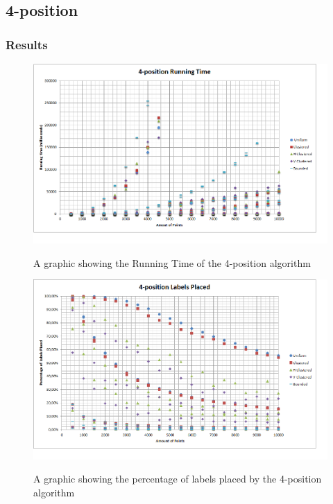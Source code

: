 \documentclass[crop=false,a4paper,oneside,11pt]{standalone}
\begin{document}
\subsection{4-position}
\subsubsection{Results}

 \begin{figure}[h!]
 \centering
 \includegraphics[scale = 0.65]{4PosRunningTime.png}\\
 \caption{A graphic showing the Running Time of the 4-position algorithm}
 \end{figure}

 \begin{figure}[h!]
 \centering
  \includegraphics[scale = 0.65]{4PosLabelsPlaced.png}\\
  \caption{A graphic showing the percentage of labels placed by the 4-position algorithm}
 \end{figure}
\end{document}
